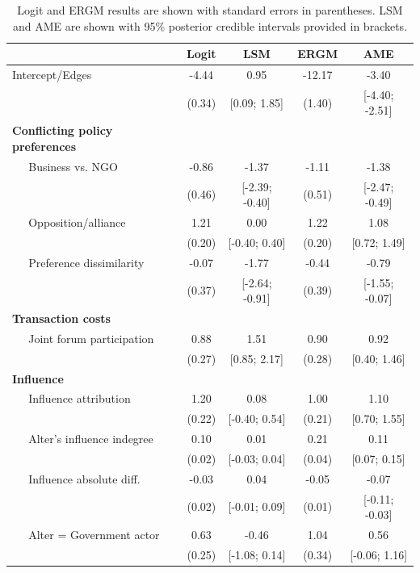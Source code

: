 \begin{table}[ht]
\centering
\caption{Logit and ERGM results are shown with standard errors in parentheses. LSM and AME are shown with 95\% posterior credible intervals provided in brackets.}
\begin{tabular}{lcccc}
   & Logit & LSM & ERGM & AME \\ 
  \hline\hline
  Intercept/Edges & -4.44 & 0.95 & -12.17 & -3.40 \\ 
   & (0.34) & [0.09; 1.85] & (1.40) & [-4.40; -2.51] \\ 
  \textbf{Conflicting policy preferences} &  &  &  &  \\ 
  $\;\;\;\;$ Business vs. NGO & -0.86 & -1.37 & -1.11 & -1.38 \\ 
   & (0.46) & [-2.39; -0.40] & (0.51) & [-2.47; -0.49] \\ 
  $\;\;\;\;$ Opposition/alliance & 1.21 & 0.00 & 1.22 & 1.08 \\ 
   & (0.20) & [-0.40; 0.40] & (0.20) & [0.72; 1.49] \\ 
  $\;\;\;\;$ Preference dissimilarity & -0.07 & -1.77 & -0.44 & -0.79 \\ 
   & (0.37) & [-2.64; -0.91] & (0.39) & [-1.55; -0.07] \\ 
  \textbf{Transaction costs} &  &  &  &  \\ 
  $\;\;\;\;$ Joint forum participation & 0.88 & 1.51 & 0.90 & 0.92 \\ 
   & (0.27) & [0.85; 2.17] & (0.28) & [0.40; 1.46] \\ 
  \textbf{Influence} &  &  &  &  \\ 
  $\;\;\;\;$ Influence attribution & 1.20 & 0.08 & 1.00 & 1.10 \\ 
   & (0.22) & [-0.40; 0.54] & (0.21) & [0.70; 1.55] \\ 
  $\;\;\;\;$ Alter's influence indegree & 0.10 & 0.01 & 0.21 & 0.11 \\ 
   & (0.02) & [-0.03; 0.04] & (0.04) & [0.07; 0.15] \\ 
  $\;\;\;\;$ Influence absolute diff. & -0.03 & 0.04 & -0.05 & -0.07 \\ 
   & (0.02) & [-0.01; 0.09] & (0.01) & [-0.11; -0.03] \\ 
  $\;\;\;\;$ Alter = Government actor & 0.63 & -0.46 & 1.04 & 0.56 \\ 
   & (0.25) & [-1.08; 0.14] & (0.34) & [-0.06; 1.16] \\ 

\end{tabular}
\end{table}
